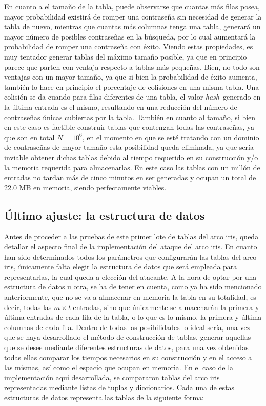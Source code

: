 \documentclass[12pt,spanish,listoffigures,listoftables]{tfgetsinf}
\newcommand{\hash}{\textit{hash}}
\begin{document}
En cuanto a el tamaño de la tabla, puede observarse que cuantas más filas posea, mayor probabilidad existirá de romper una contraseña sin necesidad de generar la tabla de nuevo, mientras que cuantas más columnas tenga una tabla, generará un mayor número de posibles contraseñas en la búsqueda, por lo cual aumentará la probabilidad de romper una contraseña con éxito. Viendo estas propiedades, es muy tentador generar tablas del máximo tamaño posible, ya que en principio parece que parten con ventaja respecto a tablas más pequeñas. Bien, no todo son ventajas con un mayor tamaño, ya que si bien la probabilidad de éxito aumenta, también lo hace en principio el porcentaje de colisiones en una misma tabla. Una colisión se da cuando para filas diferentes de una tabla, el valor \hash~generado en la última entrada es el mismo, resultando en una reducción del número de contraseñas únicas cubiertas por la tabla. También en cuanto al tamaño, si bien en este caso es factible construir tablas que contengan todas las contraseñas, ya que son en total $N = 10^6$, en el momento en que se esté tratando con un dominio de contraseñas de mayor tamaño esta posibilidad queda eliminada, ya que sería inviable obtener dichas tablas debido al tiempo requerido en su construcción y/o la memoria requerida para almacenarlas. En este caso las tablas con un millón de entradas no tardan más de cinco minutos en ser generadas y ocupan un total de 22.0 MB en memoria, siendo perfectamente viables.

\subsection{Último ajuste: la estructura de datos}

Antes de proceder a las pruebas de este primer lote de tablas del arco iris, queda detallar el aspecto final de la implementación del ataque del arco iris. En cuanto han sido determinados todos los parámetros que configurarán las tablas del arco iris, únicamente falta elegir la estructura de datos que será empleada para representarlas, la cual queda a elección del atacante. A la hora de optar por una estructura de datos u otra, se ha de tener en cuenta, como ya ha sido mencionado anteriormente, que no se va a almacenar en memoria la tabla en su totalidad, es decir, todas las $m \times t$ entradas, sino que únicamente se almacenarán la primera y última entradas de cada fila de la tabla, o lo que es lo mismo, la primera y última columnas de cada fila. Dentro de todas las posibilidades lo ideal sería, una vez que se haya desarrollado el método de construcción de tablas, generar aquellas que se desee mediante diferentes estructuras de datos, para una vez obtenidas todas ellas comparar los tiempos necesarios en su construcción y en el acceso a las mismas, así como el espacio que ocupan en memoria. En el caso de la implementación aquí desarrollada, se compararon tablas del arco iris representadas mediante listas de tuplas y diccionarios. Cada una de estas estructuras de datos representa las tablas de la siguiente forma:
\end{document}
